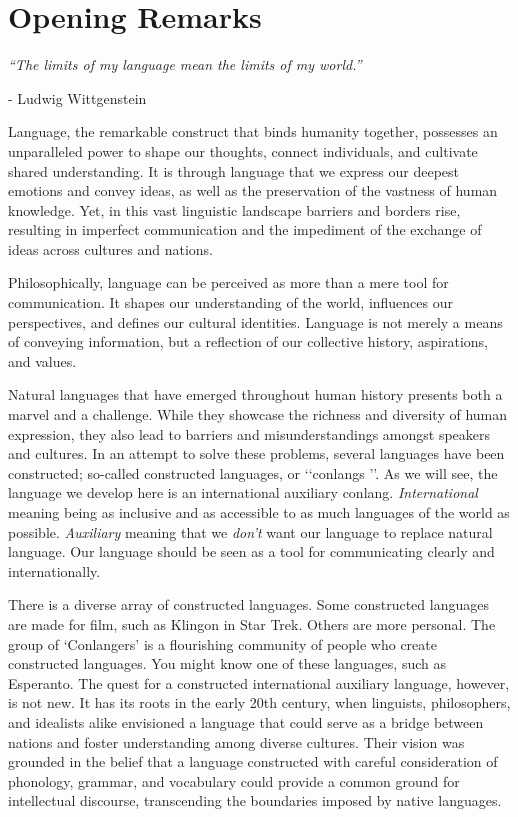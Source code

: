 
\setcounter{subsection}{-1}

\section{Opening Remarks}

\textit{“The limits of my language mean the limits of my world.”} 

- Ludwig Wittgenstein 

\vspace{0.7cm}
 

\noindent Language, the remarkable construct that binds humanity together, possesses an unparalleled power to shape our thoughts, connect individuals, and cultivate shared understanding. It is through language that we express our deepest emotions and convey ideas, as well as the preservation of the vastness of human knowledge. Yet, in this vast linguistic landscape barriers and borders rise, resulting in imperfect communication and the impediment of the exchange of ideas across cultures and nations. 

Philosophically, language can be perceived as more than a mere tool for communication. It shapes our understanding of the world, influences our perspectives, and defines our cultural identities. Language is not merely a means of conveying information, but a reflection of our collective history, aspirations, and values. 

Natural languages that have emerged throughout human history presents both a marvel and a challenge. While they showcase the richness and diversity of human expression, they also lead to barriers and misunderstandings amongst speakers and cultures. In an attempt to solve these problems, several languages have been constructed; so-called constructed languages, or \lq\lq conlangs \rq\rq. As we will see, the language we develop here is an international auxiliary conlang. {\it International} meaning being as inclusive and as accessible to as much languages of the world as possible. {\it Auxiliary} meaning that we {\it don't} want our language to replace natural language. Our language should be seen as a tool for communicating clearly and internationally. 

There is a diverse array of constructed languages. Some constructed languages are made for film, such as Klingon in Star Trek. Others are more personal. The group of ‘Conlangers’ is a flourishing community of people who create constructed languages. You might know one of these languages, such as Esperanto. The quest for a constructed international auxiliary language, however, is not new. It has its roots in the early 20th century, when linguists, philosophers, and idealists alike envisioned a language that could serve as a bridge between nations and foster understanding among diverse cultures. Their vision was grounded in the belief that a language constructed with careful consideration of phonology, grammar, and vocabulary could provide a common ground for intellectual discourse, transcending the boundaries imposed by native languages.

